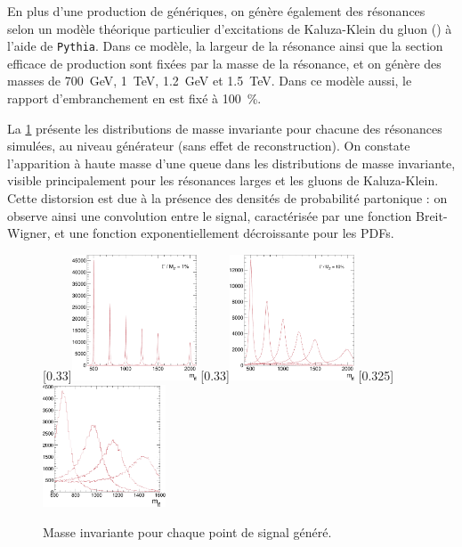 \smallskip

En plus d'une production de \zprime génériques, on génère également des résonances selon un modèle théorique particulier d'excitations de Kaluza-Klein du gluon (\kkg) \citep{Agashe:2006hk,Randall:1999vf} à l'aide de \texttt{Pythia}. Dans ce modèle, la largeur de la résonance ainsi que la section efficace de production sont fixées par la masse de la résonance, et on génère des masses de \SI{700}{\GeV}, \SI{1}{\TeV}, \SI{1.2}{\GeV} et \SI{1.5}{\TeV}. Dans ce modèle aussi, le rapport d'embranchement en \ttbar est fixé à \SI{100}{\percent}.

\medskip

La \cref{fig:mtt_gen} présente les distributions de masse invariante \ttbar pour chacune des résonances simulées, au niveau générateur (sans effet de reconstruction). On constate l'apparition à haute masse d'une queue dans les distributions de masse invariante, visible principalement pour les résonances larges et les gluons de Kaluza-Klein. Cette distorsion est due à la présence des densités de probabilité partonique : on observe ainsi une convolution entre le signal, caractérisée par une fonction Breit-Wigner, et une fonction exponentiellement décroissante pour les PDFs.

\begin{figure}[tbp] \centering
    [0.33\textwidth]{\includegraphics[width=0.33\textwidth]{chapitre7/figs/mtt_zprime_narrow_gen.pdf}} \hfill
    [0.33\textwidth]{\includegraphics[width=0.33\textwidth]{chapitre7/figs/mtt_zprime_large_gen.pdf}} \hfill
    \subcaptionbox{\kkglu}[0.325\textwidth]{\includegraphics[width=0.325\textwidth]{chapitre7/figs/mtt_rsgluons_gen.pdf}}
    \caption{Masse invariante \ttbar pour chaque point de signal généré.}
    \label{fig:mtt_gen}
\end{figure}

